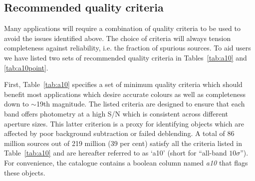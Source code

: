\documentclass[a4paper,useAMS,usenatbib]{mn2e}
\begin{document}
{\subsection{Recommended quality criteria}
\label{sec:qualitycriteria}

Many applications will require
a combination of quality criteria
to be used
to avoid the issues identified above.
The choice of criteria will always tension 
completeness against reliability,
i.e. the fraction of spurious sources.
To aid users we have listed two sets of
recommended quality criteria 
in Tables~\ref{tab:a10} and \ref{tab:a10point}.

First, Table~\ref{tab:a10} specifies
a set of minimum quality criteria
which should benefit most applications
which desire accurate colours
as well as completeness down to $\sim$19th magnitude.
The listed criteria are designed
to ensure that each band offers photometry
at a high S/N which is consistent
across different aperture sizes.
This latter criterion is a proxy
for identifying objects which are affected
by poor background subtraction
or failed deblending.
A total of 86 million sources out of 219 million 
(39 per cent) satisfy all the criteria listed in Table~\ref{tab:a10}
and are hereafter referred to as `a10'
(short for ``all-band $10\sigma$'').
For convenience, the catalogue contains a boolean column
named \emph{a10} that flags these objects.

}
\end{document}
